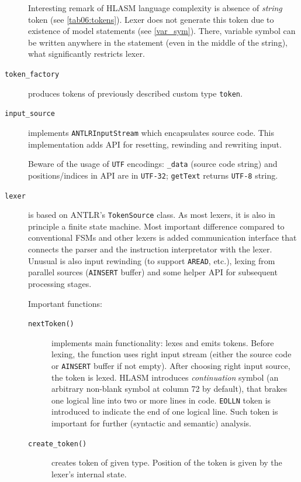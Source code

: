 \begin{description}
		Interesting remark of HLASM language complexity is absence of \emph{string} token (see \cref{tab06:tokens}). Lexer does not generate this token due to existence of model statements (see \cref{var_sym}). There, variable symbol can be written anywhere in the statement (even in the middle of the string), what significantly restricts lexer.
		
		\item[\texttt{token\_factory}] produces tokens of previously described custom type \texttt{token}.
		
		\item[\texttt{input\_source}] implements \texttt{ANTLRInputStream} which encapsulates source code. This implementation adds API for resetting, rewinding and rewriting input. 
		
		Beware of the usage of \texttt{UTF} encodings: \texttt{\_data} (source code string) and positions/indices in API are in \texttt{UTF-32}; \texttt{getText} returns \texttt{UTF-8} string.
		
		\item[\texttt{lexer}] is based on ANTLR's \texttt{TokenSource} class. As most lexers, it is also in principle a finite state machine. Most important difference compared to conventional FSMs and other lexers is added communication interface that connects the parser and the instruction interpretator with the lexer. Unusual is also input rewinding (to support \texttt{AREAD}, etc.), lexing from parallel sources (\texttt{AINSERT} buffer) and some helper API for subsequent processing stages.
		
		Important functions:
		
		\begin{description}
			\item[\texttt{nextToken()}] implements main functionality: lexes and emits tokens. Before lexing, the function uses right input stream (either the source code or \texttt{AINSERT} buffer if not empty). After choosing right input source, the token is lexed. HLASM introduces \textit{continuation} symbol (an arbitrary non-blank symbol at column 72 by default), that brakes one logical line into two or more lines in code. \texttt{EOLLN} token is introduced to indicate the end of one logical line. Such token is important for further (syntactic and semantic) analysis.
			
			\item[\texttt{create\_token()}] creates token of given type. Position of the token is given by the lexer's internal state. 
			

\end{description}
\end{description}

